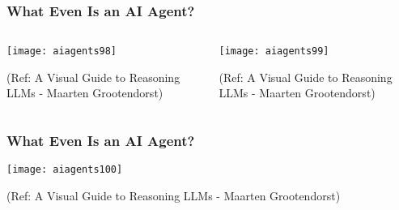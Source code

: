 \begin{frame}[fragile]\frametitle{What Even Is an AI Agent?}


\begin{columns}
    \begin{column}[T]{0.6\linewidth}
        \begin{center}
        \texttt{[image: aiagents98]}

		
        {\tiny (Ref: A Visual Guide to Reasoning LLMs - Maarten Grootendorst)}
        \end{center}

    \end{column}
    \begin{column}[T]{0.4\linewidth}
        \begin{center}
        \texttt{[image: aiagents99]}

		
        {\tiny (Ref: A Visual Guide to Reasoning LLMs - Maarten Grootendorst)}
        \end{center}
    \end{column}
  \end{columns}

\end{frame}

\begin{frame}[fragile]\frametitle{What Even Is an AI Agent?}


        \begin{center}
        \texttt{[image: aiagents100]}

		
        {\tiny (Ref: A Visual Guide to Reasoning LLMs - Maarten Grootendorst)}
        \end{center}


\end{frame}

